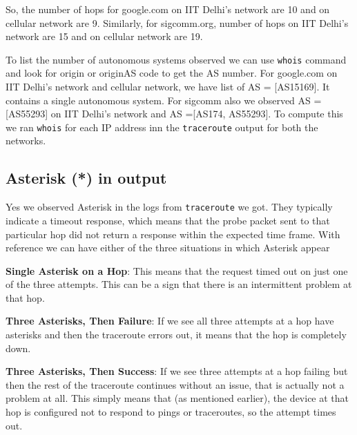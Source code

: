 \documentclass{article}
\begin{document}
\noindent
So, the number of hops for google.com on IIT Delhi's network are 10 and on cellular network are 9. Similarly, for sigcomm.org, number of hops on IIT Delhi's network are 15 and on cellular network are 19.

\noindent
To list the number of autonomous systems observed we can use \verb|whois| command and look for origin or originAS code to get the AS number. For google.com on IIT Delhi's network and cellular network, we have list of AS = [AS15169]. It contains a single autonomous system. For sigcomm also we observed AS = [AS55293] on IIT Delhi's network and AS =[AS174, AS55293]. To compute this we ran \verb|whois| for each IP address inn the \verb|traceroute| output for both the networks.

\subsection{Asterisk (*) in output}
\noindent
Yes we observed Asterisk in the logs from \verb|traceroute| we got. They typically indicate a timeout response, which means that the probe packet sent to that particular hop did not return a response within the expected time frame. With reference we can have either of the three situations in which Asterisk appear

\noindent
\textbf{Single Asterisk on a Hop}: This means that the request timed out on just one of the three attempts. This can be a sign that there is an intermittent problem at that hop.

\noindent
\textbf{Three Asterisks, Then Failure}: If we see all three attempts at a hop have asterisks and then the traceroute errors out, it means that the hop is completely down.

\noindent
\textbf{Three Asterisks, Then Success}: If we see three attempts at a hop failing but then the rest of the traceroute continues without an issue, that is actually not a problem at all. This simply means that (as mentioned earlier), the device at that hop is configured not to respond to pings or traceroutes, so the attempt times out.
\end{document}

